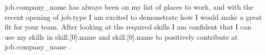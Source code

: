 {{job.company_name}} has always been on my list of places to work, and with the recent opening of {{job.type}} I am excited to demonstrate how I would make a great fit for your team. After looking at the required skills I am confident that I can use my skills in {{skill.[0].name}} and {{skill.[0].name}} to positively contribute at {{job.company_name}} .

